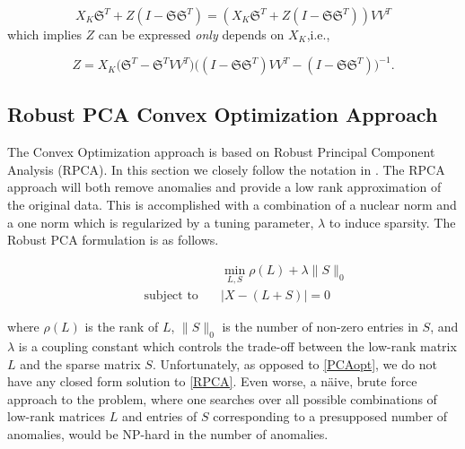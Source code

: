 \documentclass[conference]{IEEEtran}
\begin{document}

$$
X_K \mathfrak{S}^T + Z (I-\mathfrak{S} \mathfrak{S}^T) = (X_K \mathfrak{S}^T + Z (I-\mathfrak{S} \mathfrak{S}^T)) V V^T 
$$
which implies $Z$ can be expressed \emph{only} depends on $X_K$,i.e.,

$$Z= X_K \bigg(\mathfrak{S}^T - \mathfrak{S}^T V V^T\bigg) \bigg((I-\mathfrak{S} \mathfrak{S}^T)V V^T - (I-\mathfrak{S} \mathfrak{S}^T)\bigg)^{-1}.$$ 
%
%
%
%
%


\subsection{Robust PCA Convex Optimization Approach}
The Convex Optimization approach is based on Robust Principal Component Analysis (RPCA). In this section we closely follow the notation in \cite{Paffenroth2012a,Paffenroth2013b,paffenroth2018robust}. The RPCA approach will both remove anomalies and provide a low rank approximation of the original data. This is accomplished with a combination of a nuclear norm and a one norm which is regularized by a tuning parameter, $\lambda$ to induce sparsity. The Robust PCA formulation is as follows.

\begin{align} \label{RPCA}
  &\min_{L,S}\rho(L)+\lambda\|S\|_{0}\\ \nonumber
  \qquad \text{subject to} \quad &
                                   |X-(L+S)| = 0
\end{align}

\noindent where $\rho(L)$ is the rank of $L$, $\|S\|_{0}$ is the
number of non-zero entries in $S$, and $\lambda$ is a coupling
constant which controls the trade-off between the low-rank matrix $L$
and the sparse matrix $S$.  Unfortunately, as opposed to
\eqref{PCAopt}, we do not have any closed form solution to
\eqref{RPCA}.   Even worse, a n\"{a}ive, brute force
approach to the problem, where one searches over all possible
combinations of low-rank matrices $L$ and entries of $S$ corresponding
to a presupposed number of anomalies, would be NP-hard in the number
of anomalies.
\end{document}
